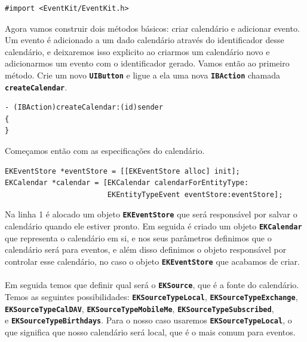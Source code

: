 \documentclass[a4paper,12pt,brazil,doubleside]{book}
\begin{document}
\begin{listing}
\begin{verbatim}
#import <EventKit/EventKit.h>
\end{verbatim}
\end{listing}

Agora vamos construir dois métodos básicos: criar calendário e adicionar evento. Um evento é adicionado a um dado calendário através do identificador desse calendário, e deixaremos isso explicito ao criarmos um calendário novo e adicionarmos um evento com o identificador gerado. Vamos então ao primeiro método. Crie um novo \texttt{\textbf{UIButton}} e ligue a ela uma nova \texttt{\textbf{IBAction}} chamada \texttt{\textbf{createCalendar}}.

\begin{listing}
\begin{verbatim}
- (IBAction)createCalendar:(id)sender
{
}
\end{verbatim}
\end{listing}

Começamos então com as especificações do calendário.

\begin{listing}
\begin{verbatim}
EKEventStore *eventStore = [[EKEventStore alloc] init];
EKCalendar *calendar = [EKCalendar calendarForEntityType:
						EKEntityTypeEvent eventStore:eventStore];
\end{verbatim}
\end{listing}

Na linha 1 é alocado um objeto \texttt{\textbf{EKEventStore}} que será responsável por salvar o calendário quando ele estiver pronto. Em seguida é criado um objeto \texttt{\textbf{EKCalendar}} que representa o calendário em si, e nos seus parâmetros definimos que o calendário será para eventos, e além disso definimos o objeto responsável por controlar esse calendário, no caso o objeto \texttt{\textbf{EKEventStore}} que acabamos de criar.
\paragraph{}Em seguida temos que definir qual será o \texttt{\textbf{EKSource}}, que é a fonte do calendário. Temos as seguintes possibilidades: \texttt{\textbf{EKSourceTypeLocal}}, \texttt{\textbf{EKSourceTypeExchange}},\\ \texttt{\textbf{EKSourceTypeCalDAV}}, \texttt{\textbf{EKSourceTypeMobileMe}}, \texttt{\textbf{EKSourceTypeSubscribed}},\\ e \texttt{\textbf{EKSourceTypeBirthdays}}. Para o nosso caso usaremos \texttt{\textbf{EKSourceTypeLocal}}, o que significa que nosso calendário será local, que é o mais comum para eventos.
\end{document}
